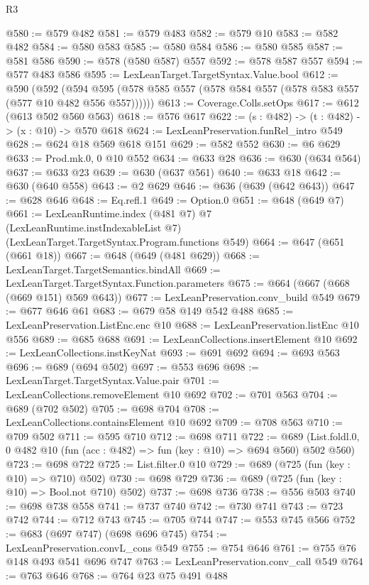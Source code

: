\begin{lexlean}{R3}
\begin{coremodule}
@580 := @579 @482
@581 := @579 @483
@582 := @579 @10
@583 := @582 @482
@584 := @580 @583
@585 := @580 @584
@586 := @580 @585
@587 := @581 @586
@590 := @578 (@580 @587) @557
@592 := @578 @587 @557
@594 := @577 @483 @586
@595 := LexLeanTarget.TargetSyntax.Value.bool
@612 := @590
    (@592 (@594 @595 (@578 @585 @557 (@578 @584 @557 (@578 @583 @557 (@577 @10 @482 @556 @557))))))
@613 := Coverage.Colls.setOps
@617 := @612 (@613 @502 @560 @563)
@618 := @576 @617
@622 := (s : @482) -> (t : @482) -> (x : @10) -> @570 @618
@624 := LexLeanPreservation.funRel_intro @549
@628 := @624 @18 @569 @618 @151
@629 := @582 @552
@630 := @6 @629
@633 := Prod.mk.{0, 0} @10 @552
@634 := @633 @28
@636 := @630 (@634 @564)
@637 := @633 @23
@639 := @630 (@637 @561)
@640 := @633 @18
@642 := @630 (@640 @558)
@643 := @2 @629
@646 := @636 (@639 (@642 @643))
@647 := @628 @646
@648 := Eq.refl.{1}
@649 := Option.{0}
@651 := @648 (@649 @7)
@661 := LexLeanRuntime.index
    (@481 @7)
    @7
    (LexLeanRuntime.instIndexableList @7)
    (LexLeanTarget.TargetSyntax.Program.functions @549)
@664 := @647 (@651 (@661 @18))
@667 := @648 (@649 (@481 @629))
@668 := LexLeanTarget.TargetSemantics.bindAll
@669 := LexLeanTarget.TargetSyntax.Function.parameters
@675 := @664 (@667 (@668 (@669 @151) @569 @643))
@677 := LexLeanPreservation.conv_build @549
@679 := @677 @646 @61
@683 := @679 @58 @149 @542 @488
@685 := LexLeanPreservation.ListEnc.enc @10
@688 := LexLeanPreservation.listEnc @10 @556
@689 := @685 @688
@691 := LexLeanCollections.insertElement @10
@692 := LexLeanCollections.instKeyNat
@693 := @691 @692
@694 := @693 @563
@696 := @689 (@694 @502)
@697 := @553 @696
@698 := LexLeanTarget.TargetSyntax.Value.pair
@701 := LexLeanCollections.removeElement @10 @692
@702 := @701 @563
@704 := @689 (@702 @502)
@705 := @698 @704
@708 := LexLeanCollections.containsElement @10 @692
@709 := @708 @563
@710 := @709 @502
@711 := @595 @710
@712 := @698 @711
@722 := @689
    (List.foldl.{0, 0} @482 @10 (fun (acc : @482) => fun (key : @10) => @694 @560) @502 @560)
@723 := @698 @722
@725 := List.filter.{0} @10
@729 := @689 (@725 (fun (key : @10) => @710) @502)
@730 := @698 @729
@736 := @689 (@725 (fun (key : @10) => Bool.not @710) @502)
@737 := @698 @736
@738 := @556 @503
@740 := @698 @738 @558
@741 := @737 @740
@742 := @730 @741
@743 := @723 @742
@744 := @712 @743
@745 := @705 @744
@747 := @553 @745 @566
@752 := @683 (@697 @747) (@698 @696 @745)
@754 := LexLeanPreservation.convL_cons @549
@755 := @754 @646
@761 := @755 @76 @148 @493 @541 @696 @747
@763 := LexLeanPreservation.conv_call @549
@764 := @763 @646
@768 := @764 @23 @75 @491 @488

\end{coremodule}
\end{lexlean}
